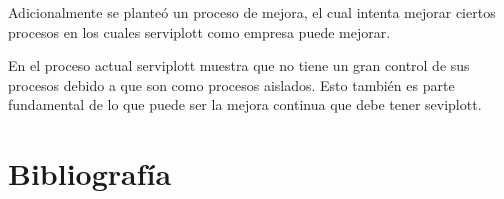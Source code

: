 Adicionalmente se planteó un proceso de mejora, el cual intenta mejorar ciertos procesos en los cuales serviplott como empresa puede mejorar. 


En el proceso actual serviplott muestra que no tiene un gran control de sus procesos debido a que son como procesos aislados. Esto también es parte fundamental de lo que puede ser la mejora continua que debe tener seviplott.

\section{Bibliografía}

	

